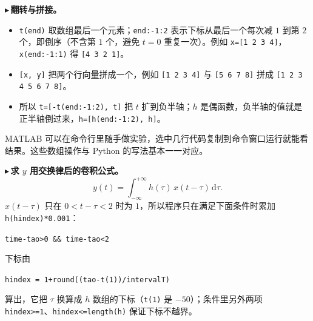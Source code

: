 \documentclass[UTF8,a4paper,11pt]{ctexart}
\newcounter{ex}[section]
\newcommand{\point}[1]{\par\addvspace{1ex}\noindent\textcolor{ptteal}{$\blacktriangleright$\,\textbf{#1}}\ }
\begin{document}
\point{翻转与拼接。}
\begin{itemize}[nosep]
\item \texttt{t(end)} 取数组最后一个元素；\texttt{end:-1:2} 表示下标从最后一个每次减 $1$ 到第 $2$ 个，即倒序（不含第 $1$ 个，避免 $t=0$ 重复一次）。例如 \texttt{x=[1 2 3 4]}，\texttt{x(end:-1:1)} 得 \texttt{[4 3 2 1]}。
\item \texttt{[x, y]} 把两个行向量拼成一个，例如 \texttt{[1 2 3 4]} 与 \texttt{[5 6 7 8]} 拼成 \texttt{[1 2 3 4 5 6 7 8]}。
\item 所以 \texttt{t=[-t(end:-1:2), t]} 把 $t$ 扩到负半轴；$h$ 是偶函数，负半轴的值就是正半轴倒过来，\texttt{h=[h(end:-1:2), h]}。
\end{itemize}
MATLAB 可以在命令行里随手做实验，选中几行代码复制到命令窗口运行就能看结果。这些数组操作与 Python 的写法基本一一对应。

\point{求 $y$ 用交换律后的卷积公式。}
\[
y(t)=\int_{-\infty}^{+\infty}h(\tau)\,x(t-\tau)\,\mathrm{d}\tau .
\]
$x(t-\tau)$ 只在 $0<t-\tau<2$ 时为 $1$，所以程序只在满足下面条件时累加 \texttt{h(hindex)*0.001}：
\begin{center}\small\texttt{time-tao>0 \&\& time-tao<2}\end{center}
下标由
\begin{center}\small\texttt{hindex = 1+round((tao-t(1))/intervalT)}\end{center}
算出，它把 $\tau$ 换算成 $h$ 数组的下标（\texttt{t(1)} 是 $-50$）；条件里另外两项 \texttt{hindex>=1}、\texttt{hindex<=length(h)} 保证下标不越界。
\end{document}
